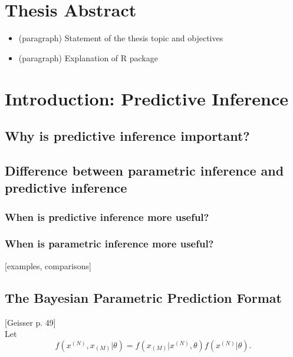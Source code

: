 \documentclass[12pt, a4paper]{article}
\begin{document}




\tableofcontents
\newpage


\section{Thesis Abstract}
  \begin{itemize}
    \item (paragraph) Statement of the thesis topic and objectives
    \item (paragraph) Explanation of R package
  \end{itemize}

\clearpage

\section{Introduction:  Predictive Inference}

  \subsection{Why is predictive inference important?}

  \subsection{Difference between parametric inference and predictive inference}

    \subsubsection{When is predictive inference more useful?}

    \subsubsection{When is parametric inference more useful?}
      [examples, comparisons]

  \subsection{The Bayesian Parametric Prediction Format}
    [Geisser p. 49]\\

        Let $$f\left(x^{(N)},x_{(M)}|\theta\right) = f\left(x_{(M)}|x^{(N)},\theta\right)f\left(x^{(N)}|\theta\right).$$
\end{document}
